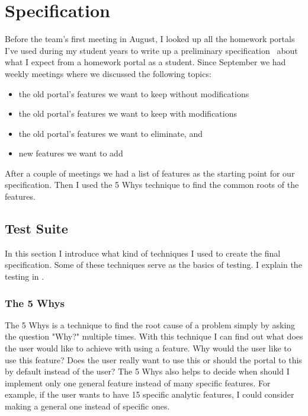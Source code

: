 \chapter{Specification}

Before the team's first meeting in August, I looked up all the homework portals I've used during my student years to write up a preliminary specification~\cite{Szepes-specification} about what I expect from a homework portal as a student. Since September we had weekly meetings where we discussed the following topics: 

\begin{itemize}
	\item the old portal's features we want to keep without modifications
	\item the old portal's features we want to keep with modifications
	\item the old portal's features we want to eliminate, and
	\item new features we want to add
\end{itemize}

After a couple of meetings we had a list of features as the starting point for our specification. Then I used the 5 Whys technique to find the common roots of the features. 


\section{Test Suite}
In this section I introduce what kind of techniques I used to create the final specification. Some of these techniques serve as the basics of testing. I explain the testing in . 

\subsection{The 5 Whys}
\label{5-whys}


The 5 Whys is a technique to find the root cause of a problem simply by asking the question "Why?" multiple times. With this technique I can find out what does the user would like to achieve with using a feature. Why would the user like to use this feature? Does the user really want to use this or should the portal to this by default instead of the user? The 5 Whys also helps to decide when should I implement only one general feature instead of many specific features. For example, if the user wants to have 15 specific analytic features, I could consider making a general one instead of specific ones. 

